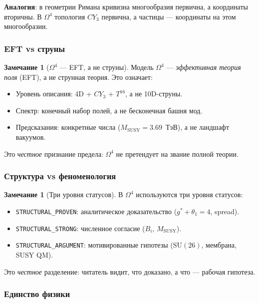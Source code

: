\documentclass[11pt,a4paper]{article}
\newcommand{\SU}{\ensuremath{\mathrm{SU}}}
\newcommand{\CY}{\ensuremath{CY_3}}
\newcommand{\Om}{\ensuremath{\Omega^4}}
\theoremstyle{definition}
\newtheorem{remark}[theorem]{Замечание}
\begin{document}
\medskip\noindent
\textbf{Аналогия}: в геометрии Римана кривизна многообразия
первична, а координаты вторичны. В $\Om$ топология $\CY$
первична, а частицы --- координаты на этом многообразии.

\subsubsection{EFT vs струны}

\begin{remark}[$\Om$ --- EFT, а не струны]
\label{rem:eft-not-strings}
Модель $\Om$ --- \emph{эффективная теория поля} (EFT),
а не струнная теория. Это означает:
\begin{itemize}
    \item Уровень описания: 4D + $\CY$ + $T^{16}$, а не 10D-струны.
    \item Спектр: конечный набор полей, а не бесконечная башня мод.
    \item Предсказания: конкретные числа ($M_{\text{SUSY}} = 3.69$~ТэВ),
          а не ландшафт вакуумов.
\end{itemize}
Это \emph{честное} признание предела: $\Om$ не претендует
на звание полной теории.
\end{remark}

\subsubsection{Структура vs феноменология}

\begin{remark}[Три уровня статусов]
\label{rem:three-levels}
В $\Om$ используются три уровня статусов:
\begin{itemize}
    \item \texttt{STRUCTURAL\_PROVEN}: аналитическое
          доказательство ($g^* + \theta_1 = 4$, spread).
    \item \texttt{STRUCTURAL\_STRONG}: численное согласие
          ($B_i$, $M_{\text{SUSY}}$).
    \item \texttt{STRUCTURAL\_ARGUMENT}: мотивированные
          гипотезы ($\SU(26)$, мембрана, SUSY QM).
\end{itemize}
Это \emph{честное} разделение: читатель видит, что доказано,
а что --- рабочая гипотеза.
\end{remark}

\subsubsection{Единство физики}
\end{document}
